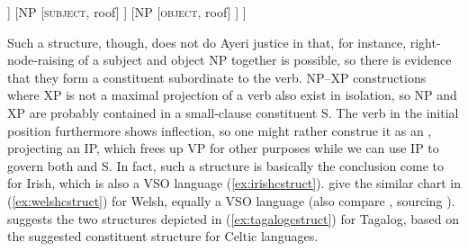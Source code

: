\ex\ljudge\ques
\begin{forest}
[S
	[V
		[\textsc{verb}]
	]
	[NP
		[\textsc{subject}, roof]
	]
	[NP
		[\textsc{object}, roof]
	]
]
\end{forest}
\xe

Such a structure, though, does not do Ayeri justice in that, for instance,
right-node-raising of a subject and object NP together is possible, so there is
evidence that they form a constituent subordinate to the verb. NP--XP
constructions where XP is not a maximal projection of a verb also exist in
isolation, so NP and XP are probably contained in a small-clause constituent S.
The verb in the initial position furthermore shows inflection, so one might
rather construe it as an , projecting an IP, which frees up VP for
other purposes while we can use IP to govern both  and S. In fact, such
a structure is basically the conclusion \citet{chungmccloskey1987} come to for
Irish, which is also a VSO language (\ref{ex:irishcstruct}).
\citet{bresnan2016} give the similar chart in (\ref{ex:welshcstruct}) for
Welsh, equally a VSO language (also compare \cite[66]{dalrymple2001}, sourcing
\cite{sadler1997}). \citet{kroeger1991} suggests the two structures depicted in
(\ref{ex:tagalogcstruct}) for Tagalog, based on the suggested constituent
structure for Celtic languages.

